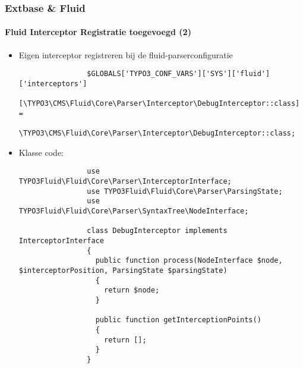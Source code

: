 \begin{frame}[fragile]
	\frametitle{Extbase \& Fluid}
	\framesubtitle{Fluid Interceptor Registratie toegevoegd (2)}

	\lstset{basicstyle=\tiny\ttfamily}

	\begin{itemize}

		\item Eigen interceptor registreren bij de fluid-parserconfiguratie

			\begin{lstlisting}
				$GLOBALS['TYPO3_CONF_VARS']['SYS']['fluid']['interceptors']
			      [\TYPO3\CMS\Fluid\Core\Parser\Interceptor\DebugInterceptor::class] =
				  \TYPO3\CMS\Fluid\Core\Parser\Interceptor\DebugInterceptor::class;
			\end{lstlisting}

		\item Klasse code:

			\begin{lstlisting}
				use TYPO3Fluid\Fluid\Core\Parser\InterceptorInterface;
				use TYPO3Fluid\Fluid\Core\Parser\ParsingState;
				use TYPO3Fluid\Fluid\Core\Parser\SyntaxTree\NodeInterface;

				class DebugInterceptor implements InterceptorInterface
				{
				  public function process(NodeInterface $node, $interceptorPosition, ParsingState $parsingState)
				  {
				    return $node;
				  }

				  public function getInterceptionPoints()
				  {
				    return [];
				  }
				}
			\end{lstlisting}

	\end{itemize}

\end{frame}

